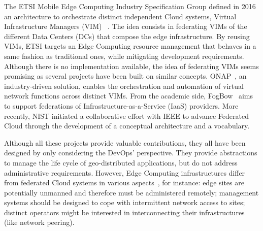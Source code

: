 


%
The ETSI Mobile Edge Computing Industry Specification Group
defined in 2016 an architecture to orchestrate distinct
independent Cloud systems, \aka Virtual
Infrastructure Managers (VIM) ~\cite{7574435}.
%
The idea consists in federating VIMs of the different Data Centers (DCs) that
compose the edge infrastructure.  By reusing VIMs, ETSI targets an Edge
Computing resource management that behaves in a same fashion as traditional ones, 
while mitigating development requirements.
%
Although there is no implementation available, the idea of federating
VIMs seems promising as several projects have been built on similar
concepts. ONAP~\cite{onap}, an industry-driven solution,
enables the orchestration and automation of virtual network functions
across distinct VIMs. From the academic side, FogBow~\cite{brasileiro2016fogbow} aims to support federations
of Infrastructure-as-a-Service (IaaS) providers. More recently, NIST
initiated a collaborative effort with IEEE to advance Federated
Cloud through the development of a conceptual architecture and a
vocabulary.

Although all these projects provide valuable contributions, they all have
been designed by only considering the DevOps' perspective. They provide
abstractions to manage the life cycle of geo-distributed applications,
but do not address administrative requirements.
%
However, Edge Computing infrastructures differ from federated Cloud systems
in various aspects~\cite{openstack:whitepaper}, for instance:
edge sites are potentially unmanned and therefore must be administered remotely;
management systems should be designed to cope with intermittent network access to sites; distinct operators might be interested in interconnecting their infrastructures (like network peering).
%

